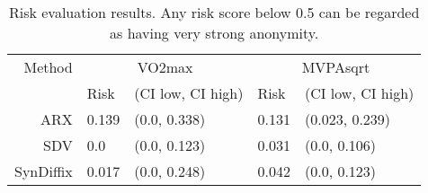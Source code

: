 \begin{table}[h]
\centering
\begin{tabular}{rllll}
\toprule
Method & \multicolumn{2}{|c|}{VO2max} & \multicolumn{2}{|c|}{MVPAsqrt} \\ 
 & Risk & (CI low, CI high) & Risk & (CI low, CI high) \\ 
\midrule
ARX & 0.139 & (0.0, 0.338) & 0.131 & (0.023, 0.239) & \\ 
SDV & 0.0 & (0.0, 0.123) & 0.031 & (0.0, 0.106) & \\ 
SynDiffix & 0.017 & (0.0, 0.248) & 0.042 & (0.0, 0.123) & \\ 
\bottomrule
\end{tabular}
\caption{Risk evaluation results. Any risk score below 0.5 can be regarded as having very strong anonymity.}
\label{tab:risk_eval}
\end{table}
